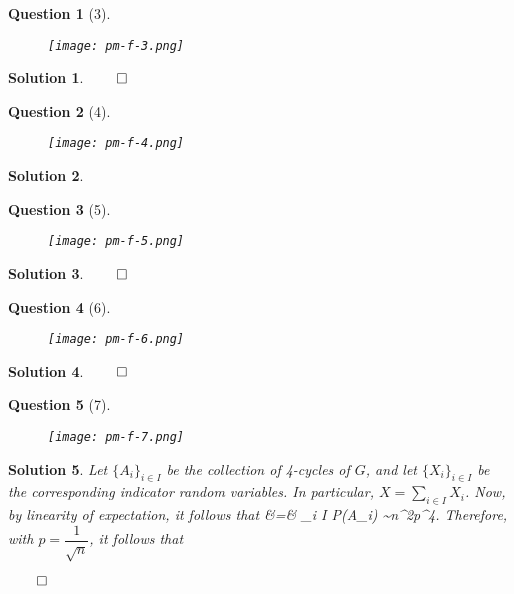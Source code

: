 \documentclass{article} %
\def\eQb#1\eQe{\begin{eqnarray*}#1\end{eqnarray*}}
\theoremstyle{quest}
\newtheorem*{question}{Question}
\newtheorem*{solution}{Solution}
\begin{document}
\newpage

\begin{question}[3]
\hfill
\begin{figure}[h!]
  \centering
    \texttt{[image: pm-f-3.png]}
\end{figure}
\end{question}
\begin{solution}
\hfill $\qed$
\end{solution}
\newpage

\begin{question}[4]
\hfill
\begin{figure}[h!]
  \centering
    \texttt{[image: pm-f-4.png]}
\end{figure}
\end{question}
\begin{solution}
\end{solution}
\newpage
\begin{question}[5]
\hfill
\begin{figure}[h!]
  \centering
    \texttt{[image: pm-f-5.png]}
\end{figure}
\end{question}
\begin{solution}
\hfill $\qed$
\end{solution}
\newpage
\begin{question}[6]
\hfill
\begin{figure}[h!]
  \centering
    \texttt{[image: pm-f-6.png]}
\end{figure}
\end{question}
\begin{solution}
\hfill $\qed$
\end{solution}
\newpage
\begin{question}[7]
\hfill
\begin{figure}[h!]
  \centering
    \texttt{[image: pm-f-7.png]}
\end{figure}
\end{question}
\begin{solution}
Let $\{A_i\}_{i\in I}$ be the collection of 4-cycles of $G$, and let $\{ X_i\}_{i \in I}$
be the corresponding indicator random variables. In particular, $X = \sum_{i \in I} X_i$. Now, 
by linearity of expectation, it follows that
\eQb
E[X] &=& \sum_{i \in I} P(A_i) \sim n^2p^4.
\eQe
Therefore, with $p = \dfrac{1}{\sqrt{n}}$, it follows that 

\hfill $\qed$
\end{solution}
\end{document}
